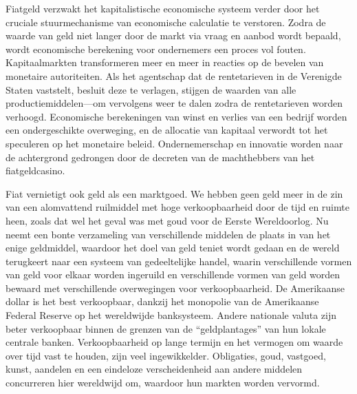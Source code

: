 Fiatgeld verzwakt het kapitalistische economische systeem verder door het cruciale stuurmechanisme van economische calculatie te verstoren. Zodra de waarde van geld niet langer door de markt via vraag en aanbod wordt bepaald, wordt economische berekening voor ondernemers een proces vol fouten. Kapitaalmarkten transformeren meer en meer in reacties op de bevelen van monetaire autoriteiten. Als het agentschap dat de rentetarieven in de Verenigde Staten vaststelt, besluit deze te verlagen, stijgen de waarden van alle productiemiddelen—om vervolgens weer te dalen zodra de rentetarieven worden verhoogd. Economische berekeningen van winst en verlies van een bedrijf worden een ondergeschikte overweging, en de allocatie van kapitaal verwordt tot het speculeren op het monetaire beleid. Ondernemerschap en innovatie worden naar de achtergrond gedrongen door de decreten van de machthebbers van het fiatgeldcasino.

Fiat vernietigt ook geld als een marktgoed. We hebben geen geld meer in de zin van een alomvattend ruilmiddel met hoge verkoopbaarheid door de tijd en ruimte heen, zoals dat wel het geval was met goud voor de Eerste Wereldoorlog. Nu neemt een bonte verzameling van verschillende middelen de plaats in van het enige geldmiddel, waardoor het doel van geld teniet wordt gedaan en de wereld terugkeert naar een systeem van gedeeltelijke handel, waarin verschillende vormen van geld voor elkaar worden ingeruild en verschillende vormen van geld worden bewaard met verschillende overwegingen voor verkoopbaarheid. De Amerikaanse dollar is het best verkoopbaar, dankzij het monopolie van de Amerikaanse Federal Reserve op het wereldwijde banksysteem. Andere nationale valuta zijn beter verkoopbaar binnen de grenzen van de ``geldplantages'' van hun lokale centrale banken. Verkoopbaarheid op lange termijn en het vermogen om waarde over tijd vast te houden, zijn veel ingewikkelder. Obligaties, goud, vastgoed, kunst, aandelen en een eindeloze verscheidenheid aan andere middelen concurreren hier wereldwijd om, waardoor hun markten worden vervormd.

